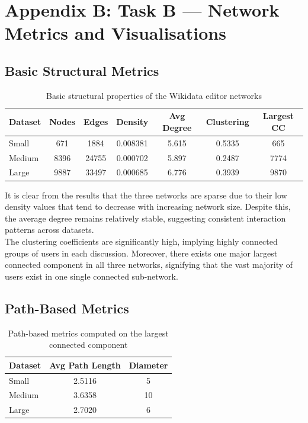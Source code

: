 \documentclass[acmsmall,nonacm,natbib=false]{acmart}
\begin{document}
\section{Appendix B: Task B — Network Metrics and Visualisations}
\label{appendix:taskB}

\subsection{Basic Structural Metrics}
\label{appendix:B.1}
\label{appendix:taskB_basic}
\begin{table}[H]
\centering
\caption{Basic structural properties of the Wikidata editor networks}
\begin{tabular}{lcccccc}
\toprule
Dataset & Nodes & Edges & Density & Avg Degree & Clustering & Largest CC \\
\midrule
Small  & 671  & 1884  & 0.008381 & 5.615 & 0.5335 & 665 \\
Medium & 8396 & 24755 & 0.000702 & 5.897 & 0.2487 & 7774 \\
Large  & 9887 & 33497 & 0.000685 & 6.776 & 0.3939 & 9870 \\
\bottomrule
\end{tabular}
\end{table}

It is clear from the results that the three networks are sparse due to their low density values that tend to decrease with increasing network size. Despite this, the average degree remains relatively stable, suggesting consistent interaction patterns across datasets. \\
The clustering coefficients are significantly high, implying highly connected groups of users in each discussion.  Moreover, there exists one major largest connected component in all three networks, signifying that the vast majority of users exist in one single connected sub-network.

\subsection{Path-Based Metrics}
\label{appendix:taskB_path}
\label{appendix:B.2}
\begin{table}[H]
\centering
\caption{Path-based metrics computed on the largest connected component}
\begin{tabular}{lcc}
\toprule
Dataset & Avg Path Length & Diameter \\
\midrule
Small  & 2.5116 & 5 \\
Medium & 3.6358 & 10 \\
Large  & 2.7020 & 6 \\
\bottomrule
\end{tabular}
\end{table}
\end{document}

